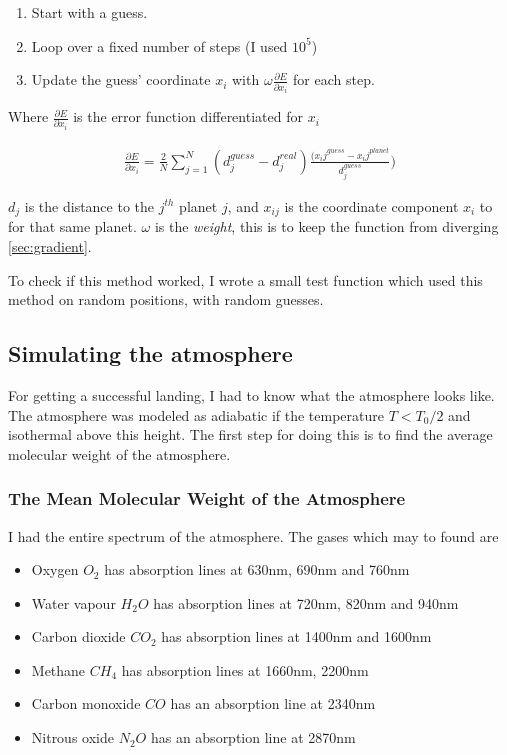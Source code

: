 \documentclass[a4paper, 10pt]{article}
\begin{document}
\begin{enumerate}
\item Start with a guess.
\item Loop over a fixed number of steps (I used $10^{5}$)
\item Update the guess' coordinate $x_i$ with $\omega \frac{\partial E}{\partial x_i}$ for each step.
\end{enumerate}

Where $\frac{\partial E}{\partial x_i}$ is the error function differentiated for $x_i$

\begin{align}\label{eq:gradient}
\frac{\partial E}{\partial x_i} = \frac{2}{N}\sum_{j=1}^N (d_j^{guess} - d_j^{real})\frac{(x_ij^{guess} - x_ij^{planet}}{d_j^{guess}})
\end{align}

$d_j$ is the distance to the $j^{th}$ planet $j$, and $x_{ij}$ is the coordinate component $x_i$ to for that same planet. $\omega$ is the \textit{weight}, this is to keep the function from diverging \ref{sec:gradient}.

To check if this method worked, I wrote a small test function which used this method on random positions, with random guesses.




\subsection{Simulating the atmosphere}

For getting a successful landing, I had to know what the atmosphere looks like. The atmosphere was modeled as adiabatic if the temperature $T < T_0/2$ and isothermal above this height. The first step for doing this is to find the average molecular weight of the atmosphere.

\subsubsection{The Mean Molecular Weight of the Atmosphere}

I had the entire spectrum of the atmosphere. The gases which may to found are

\begin{itemize}
\item Oxygen  $O_2$ has  absorption  lines  at  630nm,
690nm and 760nm
\item Water  vapour  $H_2O$  has  absorption  lines  at
720nm,  820nm  and  940nm
\item Carbon dioxide $CO_2$ has absorption lines at
1400nm and 1600nm
\item Methane $CH_4$ has   absorption   lines   at
1660nm,  2200nm
\item Carbon monoxide $CO$ has an absorption line
at 2340nm
\item Nitrous oxide $N_2O$ has  an  absorption  line  at  2870nm
\end{itemize}
\end{document}
